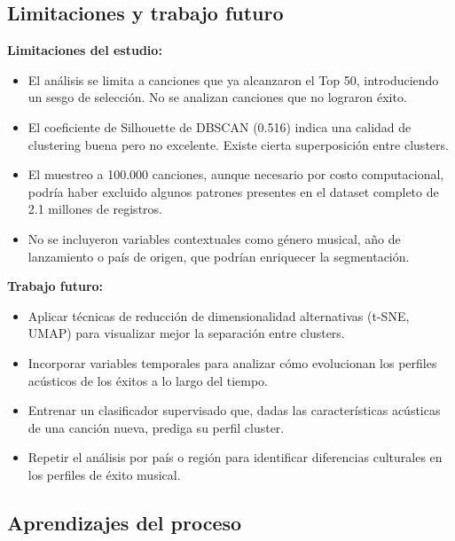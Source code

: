 \subsection{Limitaciones y trabajo futuro}

\textbf{Limitaciones del estudio:}

\begin{itemize}
    \item El análisis se limita a canciones que ya alcanzaron el Top 50, introduciendo un sesgo de selección. No se analizan canciones que no lograron éxito.
    
    \item El coeficiente de Silhouette de DBSCAN (0.516) indica una calidad de clustering buena pero no excelente. Existe cierta superposición entre clusters.
    
    \item El muestreo a 100.000 canciones, aunque necesario por costo computacional, podría haber excluido algunos patrones presentes en el dataset completo de 2.1 millones de registros.
    
    \item No se incluyeron variables contextuales como género musical, año de lanzamiento o país de origen, que podrían enriquecer la segmentación.
\end{itemize}

\textbf{Trabajo futuro:}

\begin{itemize}
    \item Aplicar técnicas de reducción de dimensionalidad alternativas (t-SNE, UMAP) para visualizar mejor la separación entre clusters.
    
    \item Incorporar variables temporales para analizar cómo evolucionan los perfiles acústicos de los éxitos a lo largo del tiempo.
    
    \item Entrenar un clasificador supervisado que, dadas las características acústicas de una canción nueva, prediga su perfil cluster.
    
    \item Repetir el análisis por país o región para identificar diferencias culturales en los perfiles de éxito musical.
\end{itemize}

\subsection{Aprendizajes del proceso}

